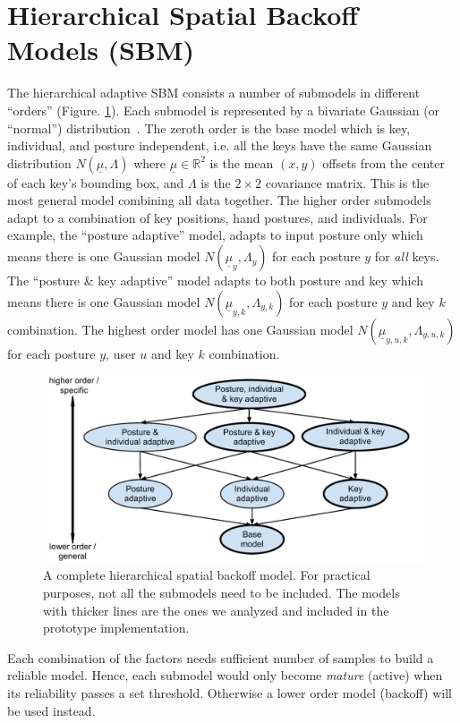 \documentclass{sigchi}
\begin{document}
\section{Hierarchical Spatial Backoff Models (SBM)}
The hierarchical adaptive SBM consists a number of submodels in different
``orders'' (Figure. \ref{fig:hierarchy}). Each submodel is represented by a
bivariate Gaussian  (or ``normal'') distribution~\cite{Azenkot:2012,
Goodman:2002, Rashid:2008}.
The zeroth order is the base model which is key, individual, and posture
independent, i.e. all the keys have the same Gaussian
distribution $N(\underline\mu, \Lambda)$ where $\underline\mu \in \mathbb{R}^2$ is the mean
$(x, y)$ offsets from the center of each key's bounding box, and $\Lambda$ is
the $2\times 2$ covariance matrix. This is the most general model combining all data together. The higher order submodels adapt to a combination of 
key positions, hand postures, and individuals. For example, the ``posture adaptive'' model, adapts to input posture only which means there is one Gaussian model $N(\underline\mu_y, \Lambda_y)$ for each posture $y$ for \textit{all} keys. The ``posture \& key adaptive'' model adapts to both posture and key which means there is one Gaussian model $N(\underline\mu_{y, k}, \Lambda_{y, k})$ for each posture $y$ and key $k$ combination.  The highest order model has one Gaussian model $N(\underline\mu_{y,u,k}, \Lambda_{y,u,k})$ for each posture $y$, user $u$ and key $k$ combination.

\begin{figure}[tb]
  \centering
  \includegraphics[width=0.9\columnwidth]{figures/hierarchy.pdf}
  \caption{A complete hierarchical spatial backoff model. For practical purposes, not all the submodels need to be included. The models with thicker lines are the ones we analyzed and included in the prototype implementation.}
  \label{fig:hierarchy}
\end{figure}

Each combination of the factors needs sufficient number of samples to build a reliable model. Hence, each submodel would only become \textit{mature} (active) when its reliability passes a set 
threshold. Otherwise a lower order model (backoff) will be used instead.
\end{document}
